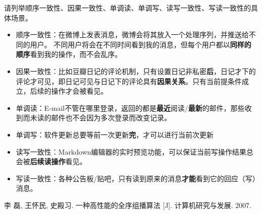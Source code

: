 \documentclass[logo,reportComp]{thesis}
\begin{document}
\begin{question}
请列举顺序一致性、因果一致性、单调读、单调写、读写一致性、写读一致性的具体场景。
\end{question}
\begin{answer}
\begin{itemize}
	\item 顺序一致性：在微博上发表消息，微博会将其放入一个处理序列，并推送给不同的用户。
	不同用户将会在不同时间看到我的消息，但每个用户都以\textbf{同样的顺序}看到我的操作，而不会乱序。
	\item 因果一致性：比如豆瓣日记的评论机制，只有设置日记非私密\textbf{后}，日记才下的评论才可见，即日记可见与日记下的评论具有\textbf{因果关系}。只有当前提条件成立，后续的操作才会被看见。
	\item 单调读：E-mail不管在哪里登录，返回的都是\textbf{最近}阅读/\textbf{最新}的邮件，那些收到而未读的邮件也不会因为多次登录而改变记录。
	\item 单调写：软件更新总要等前一次更新\textbf{完}，才可以进行当前次更新
	\item 读写一致性：Markdown编辑器的实时预览功能，可以保证当前写操作结果总会被\textbf{后续读操作}看见。
	\item 写读一致性：各种公告板/贴吧，只有读到原来的消息\textbf{才能}看到它的回应（写）消息。
\end{itemize}
\end{answer}

\begin{thebibliography}{99}
 李 磊, 王怀民, 史殿习. 一种高性能的全序组播算法 [J]. 计算机研究与发展. 2007.
\end{thebibliography}
\end{document}

